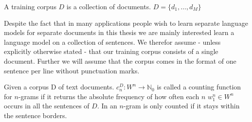 \documentclass[•]{book}
\begin{document}
\begin{definition}
A training \gls{corpus} $D$ is a collection of documents. $D=\{d_1,\dots,d_M\}$
\end{definition}

\begin{remark}
Despite the fact that in many applications people wish to learn separate language models for separate documents in this thesis we are mainly interested learn a language model on a collection of sentences. We therefor assume - unless explicitly otherwise stated - that our training corpus consists of a single document. 
Further we will assume that the corpus comes in the format of one sentence per line without punctuation marks. 
\end{remark}

\begin{definition}
Given a \gls{corpus} D of text documents. $c_n^D:W^{n}\longrightarrow\mathbb{N}_0$ is called a counting function for $n$-grams if it returns the absolute frequency of how often each $n$ $w_1^n\in W^n$ occurs in all the sentences of $D$. In an $n$-gram is only counted if it stays within the sentence borders.
\end{definition}
\end{document}

